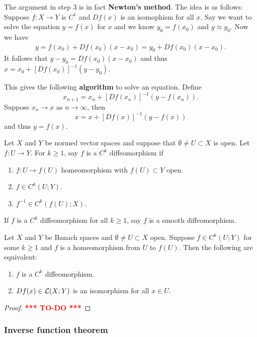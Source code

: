 \documentclass[a4paper]{article}
\newcommand{\TODO}{\textcolor{red}{\textbf{*** TO-DO ***}}}
\begin{document}
\begin{remark}
The argument in step 3 is in fact \textbf{Newton's method}. 
The idea is as follows: Suppose $f : X \to Y$ is $C^1$ 
and $Df(x)$ is an isomophism for all $x$. Say we want to 
solve the equation $y = f(x)$ for $x$ and we know $y_0 
= f(x_0)$ and $y \approx y_0$. 
Now we have 
\[
\begin{aligned}
  y = f(x_0) + Df(x_0) (x - x_0) 
  = y_0 + Df(x_0) (x - x_0).
\end{aligned}
\]
It follows that $y - y_0 = Df(x_0) (x - x_0)$ 
and thus $x = x_0 + [Df (x_0)]^{-1} (y - y_0)$.

This gives the following \textbf{algorithm} to solve 
an equation. Define 
\[
x_{n + 1} = x_n + [Df(x_n)]^{-1} (y - f(x_n)).
\]
Suppose $x_n \to x$ as $n \to \infty$, then 
\[
x = x + [Df(x)]^{-1} (y - f(x))
\]
and thus $y = f(x)$.
\end{remark}

\begin{defi}[diffeomorphism]
Let $X$ and $Y$ be normed vector spaces and suppose that
$\emptyset \neq U \subset X$ is open.
Let $f : U \to Y$. For $k \geq 1$, say $f$ is a
$C^k$ diffeomorphism if
\begin{enumerate}
  \item $f: U \to f(U)$ homeomorphism with $f(U) \subset Y$
  open.
  \item $f \in C^k(U ; Y)$.
  \item $f^{-1} \in C^k(f(U); X)$.
\end{enumerate}
If $f$ is a $C^k$ diffeomorphism for all $k \geq 1$,
say $f$ is a smooth diffeomorphism.
\end{defi}

\begin{thm}
Let $X$ and $Y$ be Banach spaces and $\emptyset \neq U \subset X$
open.  Suppose $f \in C^k(U; Y)$ for some $k \geq 1$ and
$f$ is a homeomorphism from $U$ to $f(U)$. Then the following
are equivalent:
\begin{enumerate}
\item $f$ is a $C^k$ diffeomorphism.
\item $Df(x) \in \mathcal{L}(X; Y)$ is an isomorphism for all $x \in U$.
\end{enumerate}
\end{thm}

\begin{proof}
\TODO
\end{proof}

\subsubsection{Inverse function theorem}
\end{document}
